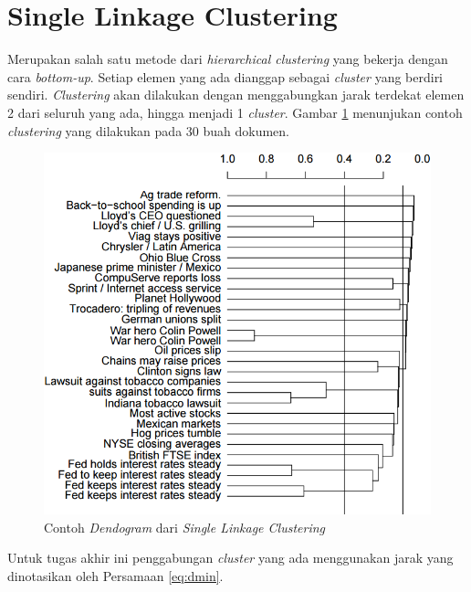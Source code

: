 \documentclass[../Proposal.tex]{subfiles}
\begin{document}
\section{Single Linkage Clustering}
Merupakan salah satu metode dari \textit{hierarchical clustering}\cite{introduction-information-retrieval} yang bekerja dengan cara \textit{bottom-up}. Setiap elemen yang ada dianggap sebagai \textit{cluster} yang berdiri sendiri. \textit{Clustering} akan dilakukan dengan menggabungkan jarak terdekat elemen 2  dari seluruh yang ada, hingga menjadi 1 \textit{cluster}. Gambar \ref{fig:dendogram} menunjukan contoh \textit{clustering} yang dilakukan pada 30 buah dokumen. 

\begin{figure}[H]
	\includegraphics[width=.9\linewidth]{../images/dendogram}
	\caption{Contoh \textit{Dendogram} dari \textit{Single Linkage Clustering}\cite{introduction-information-retrieval}}
	\label{fig:dendogram}
\end{figure}

\noindent Untuk tugas akhir ini penggabungan \textit{cluster} yang ada menggunakan jarak yang dinotasikan\cite{dist} oleh Persamaan \ref{eq:dmin}. 
\end{document}

